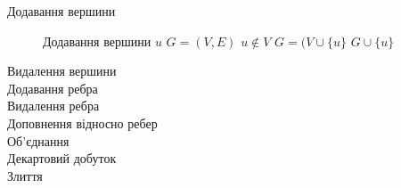 \begin{description}
\item[Додавання вершини] Додавання вершини $u$ $G=(V,E)$ $u \not\in V$ $G=(V \cup \lbrace u \rbrace$ $G \cup \lbrace u \rbrace$
\item[Видалення вершини]
\item[Додавання ребра]
\item[Видалення ребра]
\item[Доповнення відносно ребер]
\item[Об'єднання]
\item[Декартовий добуток]
\item[Злиття]
\end{description}
